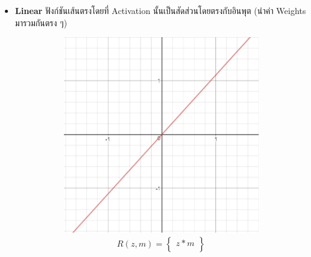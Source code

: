 \begin{itemize}
    \item \textbf{Linear} ฟังก์ชันเส้นตรงโดยที่ Activation นั้นเป็นสัดส่วนโดยตรงกับอินพุต (นำค่า Weights มารวมกันตรง ๆ)
    \begin{figure}[htbp]
        \centering
        \begin{subfigure}{0.5\textwidth}
            \centering
            \includegraphics[width=0.9\linewidth]{fig/actfunc_linear.png}
            \caption{%
                \begin{equation}
                    \begin{split}R(z,m) = \begin{Bmatrix} z*m \\
                    \end{Bmatrix}\end{split}
                \end{equation}
            }
            \label{fig:actfunc_lin}
        \end{subfigure}%
        \begin{subfigure}{0.5\textwidth}
            \centering

\end{subfigure}
\end{figure}
\end{itemize}
